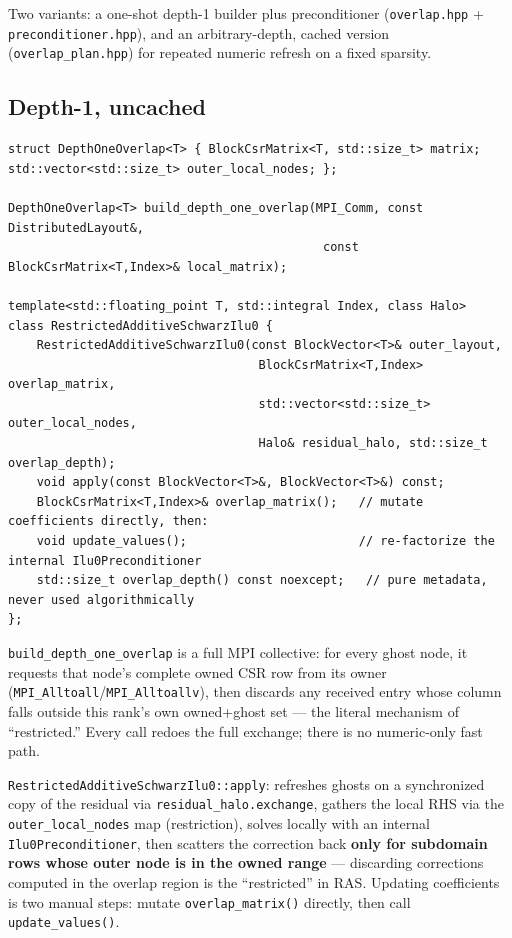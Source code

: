 \documentclass[11pt,a4paper]{report}
\begin{document}
Two variants: a one-shot depth-1 builder plus preconditioner
(\texttt{overlap.hpp} + \texttt{preconditioner.hpp}), and an
arbitrary-depth, cached version (\texttt{overlap\_plan.hpp}) for
repeated numeric refresh on a fixed sparsity.

\subsection*{Depth-1, uncached}

\begin{lstlisting}
struct DepthOneOverlap<T> { BlockCsrMatrix<T, std::size_t> matrix; std::vector<std::size_t> outer_local_nodes; };

DepthOneOverlap<T> build_depth_one_overlap(MPI_Comm, const DistributedLayout&,
                                            const BlockCsrMatrix<T,Index>& local_matrix);

template<std::floating_point T, std::integral Index, class Halo>
class RestrictedAdditiveSchwarzIlu0 {
    RestrictedAdditiveSchwarzIlu0(const BlockVector<T>& outer_layout,
                                   BlockCsrMatrix<T,Index> overlap_matrix,
                                   std::vector<std::size_t> outer_local_nodes,
                                   Halo& residual_halo, std::size_t overlap_depth);
    void apply(const BlockVector<T>&, BlockVector<T>&) const;
    BlockCsrMatrix<T,Index>& overlap_matrix();   // mutate coefficients directly, then:
    void update_values();                        // re-factorize the internal Ilu0Preconditioner
    std::size_t overlap_depth() const noexcept;   // pure metadata, never used algorithmically
};
\end{lstlisting}

\lstinline!build_depth_one_overlap! is a full MPI collective: for every
ghost node, it requests that node's complete owned CSR row from its
owner (\lstinline!MPI_Alltoall!/\lstinline!MPI_Alltoallv!), then discards any received
entry whose column falls outside this rank's own owned+ghost set ---
the literal mechanism of ``restricted.'' Every call redoes the full
exchange; there is no numeric-only fast path.

\lstinline!RestrictedAdditiveSchwarzIlu0::apply!: refreshes ghosts on a
synchronized copy of the residual via \lstinline!residual_halo.exchange!,
gathers the local RHS via the \lstinline!outer_local_nodes! map
(restriction), solves locally with an internal \lstinline!Ilu0Preconditioner!,
then scatters the correction back \textbf{only for subdomain rows
whose outer node is in the owned range} --- discarding corrections
computed in the overlap region is the ``restricted'' in RAS. Updating
coefficients is two manual steps: mutate \lstinline!overlap_matrix()!
directly, then call \lstinline!update_values()!.
\end{document}
